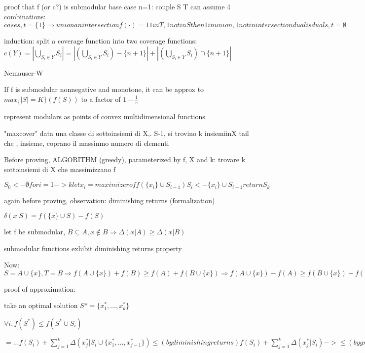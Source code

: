 \documentclass{report}
\begin{document}
	
	proof that f (or c?) is submodular
	base case n=1: couple S T can assume 4 combinations: $
	case s, t = \{1\} \Rightarrow union an intersection f(\cdot)= 1	
	1 in T, 1 not in S then 1 in union, 1 not in intersection
	dual is dual
	s, t = \emptyset
	$
	
	induction: split a coverage function into two coverage functions: $c(Y) = |\bigcup_{S_i \in Y}S_i| = |(\bigcup_{S_i \in Y}S_i)-\{n+1\}| + |(\bigcup_{S_i \in Y}S_i) \cap \{n+1\}|$
	
	Nemauser-W
	
	If f is submodular nonnegative and monotone, it can be approx to $max_\{|S|=K\}(f(S))$ to a factor of $1- \frac{1}{e}$
	
	represent modulars as points of convex multidimensional functions
	
	
	"maxcover" data una classe di sottoinsiemi di X,. S-1, si trovino k insiemiinX tail che , insieme, coprano il massinmo numero di elementi
	
	
	Before proving, ALGORITHM (greedy), parameterized by f, X and k: trovare k sottoinsiemi di X che massimizzano f
	
	$
	S_0 <- \emptyset
	for i=1 -> k
		let x_i = maximizer of f(\{x_i\} \cup S_{i-1})
		S_i <- \{x_i\} \cup S_{i-1}		
	return S_k
	$
	
	again before proving, observation: diminishing returns (formalization)
	
	$\delta(x|S) = f(\{x\}\cup S) - f(S)$ %
	
	let f be submodular, $B \subseteq A, x \notin B \Rightarrow \Delta(x|A) \geq \Delta(x|B)$ %
	
	submodular functions exhibit diminishing returns property
	
	Now: $S=A\cup\{x\}, T=B \Rightarrow f(A\cup\{x\})+f(B)\geq f(A)+f(B\cup\{x\}) \Rightarrow f(A\cup\{x\})-f(A)\geq f(B\cup\{x\})-f(B) \Rightarrow \Delta(x|A) \geq \Delta(x|B)$
	
	proof of approximation:
	
	take an optimal solution $S*=\{x_1^*, ..., x_k^*\}$
	
	$\forall i, f(S^*) \leq f(S^* \cup S_i)$ %
	
	$ = ... f(S_i) + \sum_{j=1}^{k}\Delta(x_j^*|S_i\cup \{x_1^*, ..., x_{j-1}^*\}) \leq (bydiminishingreturns) f(S_i) + \sum_{j=1}^{k}\Delta(x_j^*|S_i) -> \leq (bygreediness) f(S_i) + \sum_{j=1}^{k}\Delta(x_{i+1}|S_i) = f(S_i) + k(f(S_i \cup \{x_{i+1}\})-f(S_i)) = kf(S_{i+1}) - (k-1)f(S_i)$
	
\end{document}
